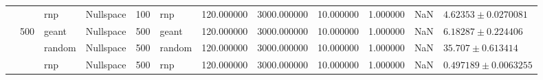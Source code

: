 \begin{tabular}{llllllllllll}
 &  & rnp & Nullspace & 100 & rnp & 120.000000 & 3000.000000 & 10.000000 & 1.000000 & NaN & $4.62353\pm0.0270081$ \\
\cline{2-12} \cline{3-12} \cline{4-12} \cline{5-12} \cline{6-12} \cline{7-12} \cline{8-12} \cline{9-12} \cline{10-12}
 & \multirow[t]{3}{*}{500} & geant & Nullspace & 500 & geant & 120.000000 & 3000.000000 & 10.000000 & 1.000000 & NaN & $6.18287\pm0.224406$ \\
\cline{3-12} \cline{4-12} \cline{5-12} \cline{6-12} \cline{7-12} \cline{8-12} \cline{9-12} \cline{10-12}
 &  & random & Nullspace & 500 & random & 120.000000 & 3000.000000 & 10.000000 & 1.000000 & NaN & $35.707\pm0.613414$ \\
\cline{3-12} \cline{4-12} \cline{5-12} \cline{6-12} \cline{7-12} \cline{8-12} \cline{9-12} \cline{10-12}
 &  & rnp & Nullspace & 500 & rnp & 120.000000 & 3000.000000 & 10.000000 & 1.000000 & NaN & $0.497189\pm0.0063255$ \\
\cline{1-12} \cline{2-12} \cline{3-12} \cline{4-12} \cline{5-12} \cline{6-12} \cline{7-12} \cline{8-12} \cline{9-12} \cline{10-12}
\bottomrule
\end{tabular}
